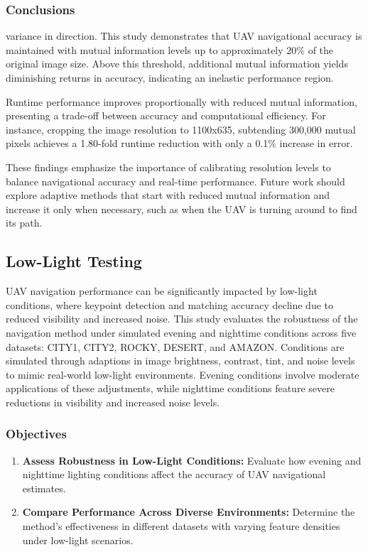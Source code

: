 \subsubsection{Conclusions}
variance in direction. 
This study demonstrates that UAV navigational accuracy is maintained with mutual information levels up to approximately 20\% of the original image size. Above this threshold, additional mutual information yields diminishing returns in accuracy, indicating an inelastic performance region.

Runtime performance improves proportionally with reduced mutual information, presenting a trade-off between accuracy and computational efficiency. For instance, cropping the image resolution to 1100x635, subtending 300,000 mutual pixels achieves a 1.80-fold runtime reduction with only a 0.1\% increase in error.

These findings emphasize the importance of calibrating resolution levels to balance navigational accuracy and real-time performance. Future work should explore adaptive methods that start with reduced mutual information and increase it only when necessary, such as when the UAV is turning around to find its path. 




\subsection{Low-Light Testing}

UAV navigation performance can be significantly impacted by low-light conditions, where keypoint detection and matching accuracy decline due to reduced visibility and increased noise. This study evaluates the robustness of the navigation method under simulated evening and nighttime conditions across five datasets: CITY1, CITY2, ROCKY, DESERT, and AMAZON. Conditions are simulated through adaptions in image brightness, contrast, tint, and noise levels to mimic real-world low-light environments. Evening conditions involve moderate applications of these adjustments, while nighttime conditions feature severe reductions in visibility and increased noise levels. 

\subsubsection{Objectives}

\begin{enumerate}
    \item \textbf{Assess Robustness in Low-Light Conditions:} Evaluate how evening and nighttime lighting conditions affect the accuracy of UAV navigational estimates.
    \item \textbf{Compare Performance Across Diverse Environments:} Determine the method's effectiveness in different datasets with varying feature densities under low-light scenarios.
\end{enumerate}

